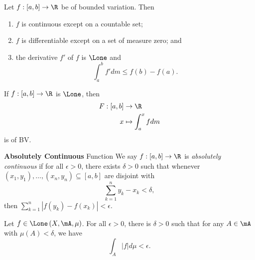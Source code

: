 \documentclass[pmath451]{subfiles}
\begin{document}
    \begin{cor}{}
        Let $f:\left[ a,b \right]\to\R$ be of bounded variation. Then
        \begin{enumerate}
            \item $f$ is continuous except on a countable set;
            \item $f$ is differentiable except on a set of measure zero; and
            \item the derivative $f'$ of $f$ is $\Lone$ and
                \begin{equation*}
                    \int^{b}_{a}f'dm \leq f\left( b \right)-f\left( a \right).
                \end{equation*}
        \end{enumerate}
    \end{cor}	

    \rruleline

    \begin{cor}{}
        If $f:\left[ a,b \right]\to\R$ is $\Lone$, then
        \begin{equation*}
            \begin{aligned}
                F:\left[ a,b \right]&\to\R \\
                x&\mapsto\int^{x}_{a}fdm
            \end{aligned} 
        \end{equation*}
        is of BV.
    \end{cor}	
    
    \rruleline
    
    \begin{definition}{\textbf{Absolutely Continuous} Function}
        We say $f:\left[ a,b \right]\to\R$ is \emph{absolutely continuous} if for all $\epsilon>0$, there exists $\delta>0$ such that whenever $\left( x_1,y_1 \right),\ldots,\left( x_n,y_n \right)\subseteq\left[ a,b \right]$ are disjoint with
        \begin{equation*}
            \sum^{n}_{k=1} y_k-x_k < \delta,
        \end{equation*}
        then $\sum^{n}_{k=1} \left| f\left( y_k \right)-f\left( x_k \right) \right|<\epsilon$.
    \end{definition}

    \begin{prop}{}
        Let $f\in\Lone\left( X,\mA,\mu \right)$. For all $\epsilon>0$, there is $\delta>0$ such that for any $A\in\mA$ with $\mu\left( A \right)<\delta$, we have
        \begin{equation*}
            \int^{}_{A}\left| f \right|d\mu < \epsilon.
        \end{equation*}
    \end{prop}
    
\end{document}
